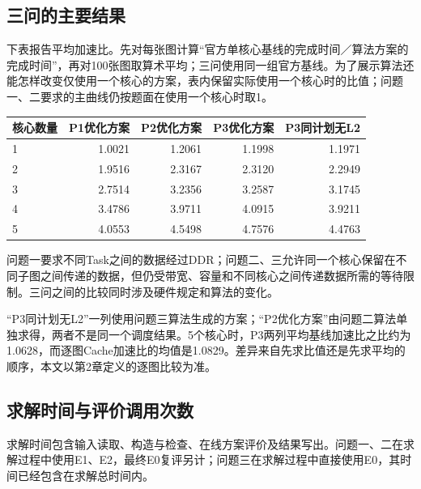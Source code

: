 \documentclass[anonymous,notoc]{gmcm2026}
\begin{document}
\subsection{三问的主要结果}

下表报告平均加速比。先对每张图计算``官方单核心基线的完成时间／算法方案的完成时间''，再对100张图取算术平均；三问使用同一组官方基线。为了展示算法还能怎样改变仅使用一个核心的方案，表内保留实际使用一个核心时的比值；问题一、二要求的主曲线仍按题面在使用一个核心时取1。

{\def\LTcaptype{table} %
\begin{table}[!htbp]\centering\small
\begin{tabular}{@{}lrrrr@{}}
\toprule\noalign{}
核心数量 & P1优化方案 & P2优化方案 & P3优化方案 & P3同计划无L2 \\
\midrule\noalign{}


1 & 1.0021 & 1.2061 & 1.1998 & 1.1971 \\
2 & 1.9516 & 2.3167 & 2.3120 & 2.2949 \\
3 & 2.7514 & 3.2356 & 3.2587 & 3.1745 \\
4 & 3.4786 & 3.9711 & 4.0915 & 3.9211 \\
5 & 4.0553 & 4.5498 & 4.7576 & 4.4763 \\
\bottomrule\end{tabular}
\end{table}
}

问题一要求不同Task之间的数据经过DDR；问题二、三允许同一个核心保留在不同子图之间传递的数据，但仍受带宽、容量和不同核心之间传递数据所需的等待限制。三问之间的比较同时涉及硬件规定和算法的变化。

``P3同计划无L2''一列使用问题三算法生成的方案；``P2优化方案''由问题二算法单独求得，两者不是同一个调度结果。5个核心时，P3两列平均基线加速比之比约为1.0628，而逐图Cache加速比的均值是1.0829。差异来自先求比值还是先求平均的顺序，本文以第2章定义的逐图比较为准。

\subsection{求解时间与评价调用次数}

求解时间包含输入读取、构造与检查、在线方案评价及结果写出。问题一、二在求解过程中使用E1、E2，最终E0复评另计；问题三在求解过程中直接使用E0，其时间已经包含在求解总时间内。
\end{document}
